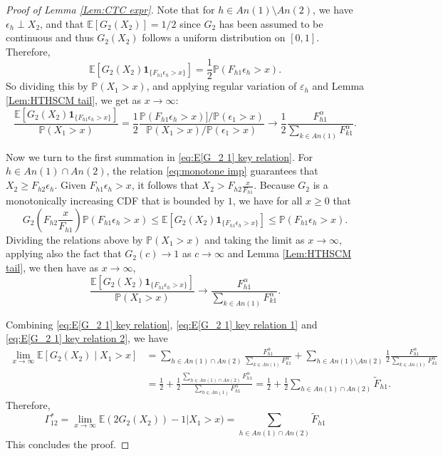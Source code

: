 \documentclass[10pt]{article}
\begin{document}
\begin{proof}[Proof of Lemma \ref{Lem:CTC expr}]
    Note that for $h \in An(1) \setminus An(2)$, we have $\epsilon_h \perp X_2$, and that $\mathbb{E}[G_2(X_2)] = 1/2$ since $G_2$ has been assumed to be continuous and thus $G_2(X_2)$ follows a uniform distribution on $[0,1]$. Therefore,
    \[
        \mathbb{E}[G_2(X_2) \mathbf{1}_{\{F_{h1} \epsilon_h > x\}}] = \frac{1}{2} \mathbb{P}(F_{h1} \epsilon_h > x).
    \]
    So dividing   this by $\mathbb{P}(X_1 > x)$, and applying regular variation of $\varepsilon_h$ and Lemma \ref{Lem:HTHSCM tail}, we get as $x\rightarrow\infty$:
    \begin{equation}\label{eq:E[G_2 1] key relation 1}
        \frac{\mathbb{E}[G_2(X_2) \mathbf{1}_{\{F_{h1} \epsilon_h > x\}}]}{\mathbb{P}(X_1 > x)}  =  \frac{1}{2}\frac{ \mathbb{P}(F_{h1} \epsilon_h > x)] / \mathbb{P}(\epsilon_1 > x)}{\mathbb{P}(X_1 > x) / \mathbb{P}(\epsilon_1 > x)} \to \frac{1}{2} \frac{F_{h1}^\alpha}{\sum_{k \in An(1)} F_{k1}^\alpha}.
    \end{equation}

    Now we turn to the first summation in \eqref{eq:E[G_2 1] key relation}. For $h \in An(1) \cap An(2)$, the relation \eqref{eq:monotone imp} guarantees that $X_2 \ge F_{h2} \epsilon_h$. Given $F_{h1} \epsilon_h > x$, it follows that $X_2 > F_{h2} \frac{x}{F_{h1}}$. Because $G_2$ is a monotonically increasing CDF that is bounded by $1$, we have for all $x\ge 0$ that
    \[
        G_2\left( F_{h2} \frac{x}{F_{h1}} \right) \mathbb{P}(F_{h1} \epsilon_h > x) \le \mathbb{E}[G_2(X_2) \mathbf{1}_{\{F_{h1} \epsilon_h > x\}}] \le \mathbb{P}(F_{h1} \epsilon_h > x).
    \]
    Dividing the  relations above by $\mathbb{P}(X_1 > x)$ and taking the limit as $x \to \infty$,  applying also the fact that $G_2(c) \to 1$ as $c \to \infty$ and Lemma \ref{Lem:HTHSCM tail}, we then have  as $x\rightarrow\infty$,
    \begin{equation}\label{eq:E[G_2 1] key relation 2}
        \frac{\mathbb{E}[G_2(X_2) \mathbf{1}_{\{F_{h1} \epsilon_h > x\}}]}{\mathbb{P}(X_1 > x)} \to \frac{F_{h1}^\alpha}{\sum_{k \in An(1)} F_{k1}^\alpha}.
    \end{equation}

Combining \eqref{eq:E[G_2 1] key relation}, \eqref{eq:E[G_2 1] key relation 1} and \eqref{eq:E[G_2 1] key relation 2}, we have
\begin{align*}
    \lim_{x \to \infty} \mathbb{E}[G_2(X_2) \mid X_1 > x] &= \sum_{h \in An(1) \cap An(2)} \frac{F_{h1}^\alpha}{\sum_{k \in An(1)} F_{k1}^\alpha} + \sum_{h \in An(1) \setminus An(2)} \frac{1}{2} \frac{F_{h1}^\alpha}{\sum_{k \in An(1)} F_{k1}^\alpha} \\
    &= \frac{1}{2} + \frac{1}{2} \frac{\sum_{h \in An(1) \cap An(2)} F_{h1}^\alpha}{\sum_{h \in An(1)} F_{h1}^\alpha}= \frac{1}{2}+\frac{1}{2}\sum_{h \in An(1) \cap An(2)}\widetilde{F}_{h1}.
\end{align*}
Therefore,  \[
\Gamma^*_{12}= \lim_{x \to \infty} \mathbb{E}(2G_2(X_2))-1 | X_1 >x) = \sum_{h \in An(1) \cap An(2)}\widetilde{F}_{h1}
\]
This concludes the proof.
\end{proof}
 
\end{document}

